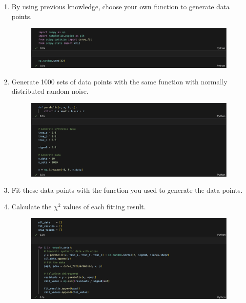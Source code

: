 \documentclass[12pt,a4paper]{article}
\begin{document}
\begin{CJK}{UTF8}{bkai}
\begin{enumerate}
    \item By using previous knowledge, choose your own function to generate data points.
    \begin{figure}[h]
        \centering
        \includegraphics[width=1\linewidth]{figures/code/practice_1/code_1_1.png}
        \label{fig:code_1_1}
    \end{figure}
    \item Generate 1000 sets of data points with the same function with normally distributed random noise.
    \begin{figure}[h]
        \centering
        \includegraphics[width=1\linewidth]{figures/code/practice_1/code_1_2.png}
        \label{fig:code_1_2}
    \end{figure}
    \clearpage
    \item Fit these data points with the function you used to generate the data points.
    \item Calculate the $\chi^2$ values of each fitting result.
    \begin{figure}[h]
        \centering
        \includegraphics[width=1\linewidth]{figures/code/practice_1/code_1_3.png}

\end{figure}
\end{enumerate}
\end{CJK}
\end{document}
